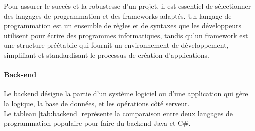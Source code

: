 \documentclass[12pt]{report}
\begin{document}
				\hspace{15pt} Pour assurer le succès et la robustesse d'un projet, il est essentiel de sélectionner des langages de programmation et des frameworks adaptés. Un langage de programmation est un ensemble de règles et de syntaxes que les développeurs utilisent pour écrire des programmes informatiques, tandis qu'un framework est une structure préétablie qui fournit un environnement de développement, simplifiant et standardisant le processus de création d'applications.


				\paragraph{Back-end}
				
				Le backend désigne la partie d'un système logiciel ou d'une application qui gère la logique, la base de données, et les opérations côté serveur.\\

				Le tableau \ref{tab:backend} représente la comparaison entre deux langages de programmation populaire pour faire du backend Java et C\#.
				
\end{document}
